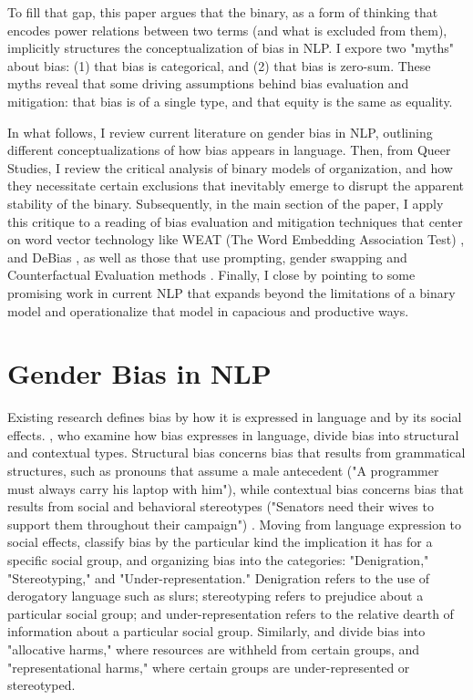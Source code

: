 \documentclass[11pt]{article}
\begin{document}
To fill that gap, this paper argues that the binary, as a form of
thinking that encodes power relations between two terms (and what is
excluded from them), implicitly structures the conceptualization of
bias in NLP. I expore two "myths" about bias: (1) that bias is
categorical, and (2) that bias is zero-sum. These myths reveal that
some driving assumptions behind bias evaluation and mitigation: that
bias is of a single type, and that equity is the same as equality.

In what follows, I review current literature on gender bias in NLP,
outlining different conceptualizations of how bias appears in
language. Then, from Queer Studies, I review the critical analysis of
binary models of organization, and how they necessitate certain
exclusions that inevitably emerge to disrupt the apparent stability of
the binary. Subsequently, in the main section of the paper, I apply
this critique to a reading of bias evaluation and mitigation
techniques that center on word vector technology like WEAT (The Word
Embedding Association Test) \citep{caliskan:2017}, and DeBias
\citep{bolukbasi:2016}, as well as those that use prompting, gender swapping and
Counterfactual Evaluation
methods \citep{zhao:2018,meade:2022,nemani:2023}. Finally, I close by
pointing to some promising work in current NLP that expands beyond the
limitations of a binary model and operationalize that model in
capacious and productive ways.

\section{Gender Bias in NLP} \label{gbnlp}

Existing research defines bias by how it is expressed in language and
by its social effects. \citet{hitti:2019}, who examine how bias
expresses in language, divide bias into structural and contextual
types. Structural bias concerns bias that results from grammatical
structures, such as pronouns that assume a male antecedent ("A
programmer must always carry his laptop with him"), while contextual
bias concerns bias that results from social and behavioral stereotypes
("Senators need their wives to support them throughout their
campaign") \citep{hitti:2019}. Moving from language expression to
social effects, \citet{nemani:2023} classify bias by the particular
kind the implication it has for a specific social group, and
organizing bias into the categories: "Denigration," "Stereotyping,"
and "Under-representation." Denigration refers to the use of
derogatory language such as slurs; stereotyping refers to prejudice
about a particular social group; and under-representation refers to
the relative dearth of information about a particular social group.
Similarly, \citet{blodgett:2020} and \citet{barocas:2017} divide bias
into "allocative harms," where resources are withheld from certain
groups, and "representational harms," where certain groups are
under-represented or stereotyped.
\end{document}
